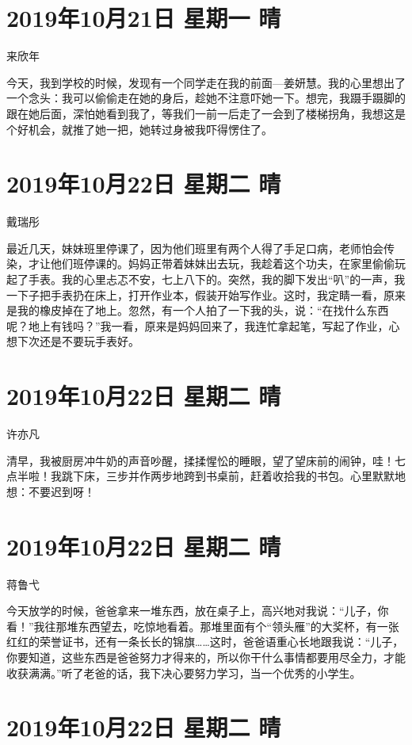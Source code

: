 \section{2019年10月21日 星期一 晴}

来欣年

今天，我到学校的时候，发现有一个同学走在我的前面---姜妍慧。我的心里想出了一个念头：我可以偷偷走在她的身后，趁她不注意吓她一下。想完，我蹑手蹑脚的跟在她后面，深怕她看到我了，等我们一前一后走了一会到了楼梯拐角，我想这是个好机会，就推了她一把，她转过身被我吓得愣住了。

\section{2019年10月22日 星期二 晴}

戴瑞彤

最近几天，妹妹班里停课了，因为他们班里有两个人得了手足口病，老师怕会传染，才让他们班停课的。妈妈正带着妹妹出去玩，我趁着这个功夫，在家里偷偷玩起了手表。我的心里忐忑不安，七上八下的。突然，我的脚下发出``叭''的一声，我一下子把手表扔在床上，打开作业本，假装开始写作业。这时，我定睛一看，原来是我的橡皮掉在了地上。忽然，有一个人拍了一下我的头，说：``在找什么东西呢？地上有钱吗？''我一看，原来是妈妈回来了，我连忙拿起笔，写起了作业，心想下次还是不要玩手表好。

\section{2019年10月22日 星期二 晴}

许亦凡

清早，我被厨房冲牛奶的声音吵醒，揉揉惺忪的睡眼，望了望床前的闹钟，哇！七点半啦！我跳下床，三步并作两步地跨到书桌前，赶着收拾我的书包。心里默默地想：不要迟到呀！

\section{2019年10月22日 星期二 晴}

蒋鲁弋

今天放学的时候，爸爸拿来一堆东西，放在桌子上，高兴地对我说：``儿子，你看！''我往那堆东西望去，吃惊地看着。那堆里面有个``领头雁''的大奖杯，有一张红红的荣誉证书，还有一条长长的锦旗\ldots\ldots 这时，爸爸语重心长地跟我说：``儿子，你要知道，这些东西是爸爸努力才得来的，所以你干什么事情都要用尽全力，才能收获满满。''听了老爸的话，我下决心要努力学习，当一个优秀的小学生。

\section{2019年10月22日 星期二 晴}

